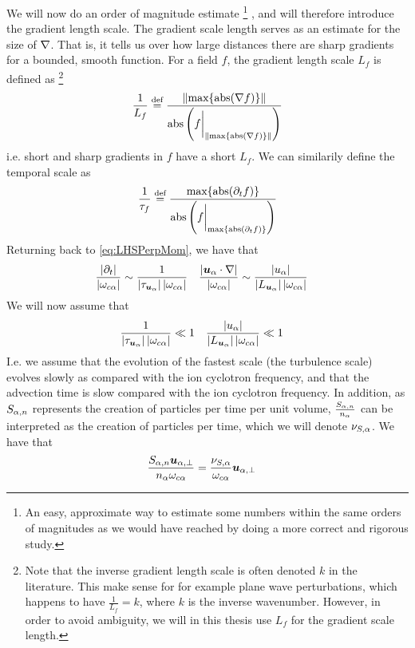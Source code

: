 %
We will now do an order of magnitude estimate%
\footnote{
    An easy, approximate way to estimate some numbers within the same orders of magnitudes as we would have reached by doing a more correct and rigorous study.
}%
, and will therefore introduce the gradient length scale.
The gradient scale length serves as an estimate for the size of $\nabla$.
That is, it tells us over how large distances there are sharp gradients for a bounded, smooth function.
For a field $f$, the gradient length scale $L_f$ is defined as%
\footnote{
    Note that the inverse gradient length scale is often denoted $k$ in the literature.
    This make sense for for example plane wave perturbations, which happens to have $\frac{1}{L_f}=k$, where $k$ is the inverse wavenumber.
    However, in order to avoid ambiguity, we will in this thesis use $L_f$ for the gradient scale length.
}%
%
\begin{align*}
    \frac{1}{L_f} \overset{\text{def}}{=} \frac{\|\text{max}\{\operatorname{abs}(\nabla f)\}\|}{\operatorname{abs}\left(f\bigg|_{\|\text{max}\{\operatorname{abs}(\nabla f)\}\|}\right)}
\end{align*}
%
i.e. short and sharp gradients in $f$ have a short $L_f$.
We can similarily define the temporal scale as
%
\begin{align*}
    \frac{1}{\tau_f} \overset{\text{def}}{=} \frac{\text{max}\{\operatorname{abs}(\partial_t f)\}}{\operatorname{abs}\left(f\bigg|_{\text{max}\{\operatorname{abs}(\partial_t f)\}}\right)}
\end{align*}
%
Returning back to \cref{eq:LHSPerpMom}, we have that
%
\begin{align*}
 &\frac{\L|\partial_t\R|}{\L|\om_{c\a}\R|}  \sim
 \frac{1}{\L|\tau_{\ve{u}_\a}\R|\L|\om_{c\a}\R|}&
%
 &\frac{\L|\ve{u}_{\a}\cdot\nabla\R|}{\L|\om_{c\a}\R|} \sim
 \frac{\L|u_{\a}\R|}{\L|L_{\ve{u}_\a}\R|\L|\om_{c\a}\R|}
\end{align*}
%
We will now assume that
%
\begin{align*}
 &\frac{1}{\L|\tau_{\ve{u}_\a}\R|\L|\om_{c\a}\R|} \ll 1&
%
 &\frac{\L|u_{\a}\R|}{\L|L_{\ve{u}_\a}\R|\L|\om_{c\a}\R|} \ll 1
\end{align*}
%
I.e. we assume that the evolution of the fastest scale (the turbulence scale) evolves slowly as compared with the ion cyclotron frequency, and that the advection time is slow compared with the ion cyclotron frequency.
In addition, as $S_{\alpha,n}$ represents the creation of particles per time per unit volume, $\frac{S_{\alpha,n}}{n_\alpha}$ can be interpreted as the creation of particles per time, which we will denote $\nu_{S,\alpha}$.
We have that
%
\begin{align*}
 \frac{
     S_{\alpha,n}\boldsymbol{u}_{\alpha,\perp}
 }{n_\alpha \omega_{c\alpha}}
 &=
 \frac{
     \nu_{S,\alpha}
 }{ \omega_{c\alpha}}
\boldsymbol{u}_{\alpha,\perp}
\end{align*}
